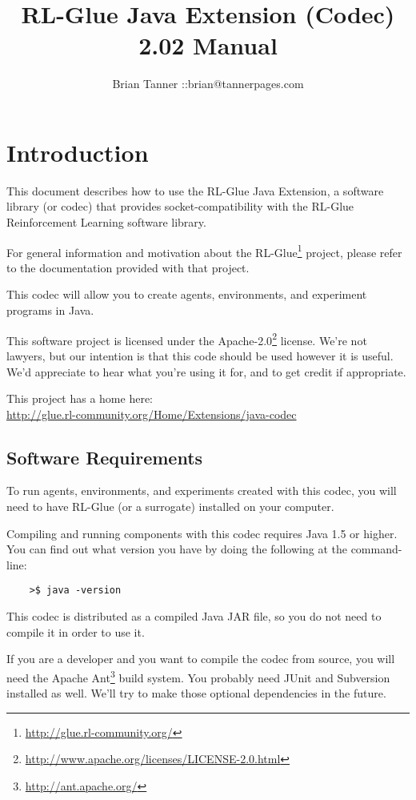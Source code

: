 \documentclass[11pt]{article}
\title{RL-Glue Java Extension (Codec) 2.02 Manual }
\author{Brian Tanner ::brian@tannerpages.com}
\begin{document}
\maketitle
\tableofcontents

\section{Introduction}

This document describes how to use the RL-Glue Java Extension, a software library (or codec) that provides socket-compatibility with the RL-Glue Reinforcement Learning software library.

For general information and motivation about the RL-Glue\footnote{\url{http://glue.rl-community.org/}} project, please refer to the documentation provided with that project.

This codec will allow you to create agents, environments, and experiment programs in Java.

This software project is licensed under the Apache-2.0\footnote{\url{http://www.apache.org/licenses/LICENSE-2.0.html}} license. We're not lawyers, but our intention is that this code 
should be used however it is useful.  We'd appreciate to hear what you're using it for, and to get credit if appropriate.

This project has a home here:\\
\url{http://glue.rl-community.org/Home/Extensions/java-codec}



\subsection{Software Requirements}
To run agents, environments, and experiments created with this codec, you will need to have RL-Glue (or a surrogate) installed on your computer.

Compiling and running components with this codec requires Java 1.5 or higher. You can find out what version you have by doing the following at the command-line:
\begin{verbatim}
	>$ java -version
\end{verbatim}

This codec is distributed as a compiled Java JAR file, so you do not need to compile it in order to use it.

If you are a developer and you want to compile the codec from source, you will need the Apache Ant\footnote{\url{http://ant.apache.org/}} build system.  You probably need JUnit and Subversion installed as well. We'll try to make those optional dependencies in the future.
\end{document}
